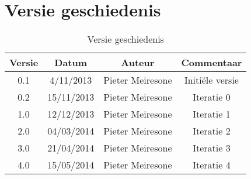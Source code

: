 \chapter{Versie geschiedenis}

\begin{table}[htbp]
	\centering
	\caption{Versie geschiedenis}
	\begin{tabular} {c|c|c|c}
		\textbf{Versie} & \textbf{Datum} 	& \textbf{Auteur} & \textbf{Commentaar} \\
		\hline
		0.1 			& 4/11/2013 		& Pieter Meiresone & Initi\"{e}le versie \\
		0.2 			& 15/11/2013		& Pieter Meiresone & Iteratie 0 \\
		1.0 			& 12/12/2013		& Pieter Meiresone & Iteratie 1 \\
		2.0 			& 04/03/2014		& Pieter Meiresone & Iteratie 2 \\
		3.0 			& 21/04/2014		& Pieter Meiresone & Iteratie 3 \\
		4.0			& 15/05/2014		& Pieter Meiresone & Iteratie 4
	\end{tabular}
\end{table}